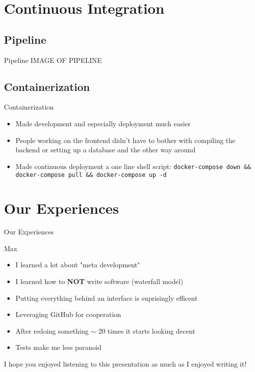 \documentclass{beamer}
\begin{document}
\section{Continuous Integration}
\subsection{Pipeline}
\begin{frame}{Pipeline}
  \Large{IMAGE OF PIPELINE}
\end{frame}

\subsection{Containerization}
\begin{frame}{Containerization}
  \begin{itemize}
    \item Made development and especially deployment much easier
    \item People working on the frontend didn't have to bother with compiling the backend or setting up a database and the other way around
    \item Made continuous deployment a one line shell script: \texttt{docker-compose down \&\& docker-compose pull \&\& docker-compose up -d}
  \end{itemize}
\end{frame}

\section{Our Experiences}

\begin{frame}
  \begin{center}
    \Huge{Our Experiences}
  \end{center}
\end{frame}

\begin{frame}{Max}
  \begin{itemize}
    \item I learned a lot about "meta development"
    \item I learned how to \textbf{NOT} write software (waterfall model)
    \item Putting everything behind an interface is suprisingly efficent
    \item Leveraging GitHub for cooperation
    \item After redoing something $\sim$ 20 times it starts looking decent
    \item Tests make me less paranoid
  \end{itemize}
\end{frame}

\begin{frame}
  \begin{center}
    \Huge{I hope you enjoyed listening to this presentation as much as I enjoyed writing it!}
  \end{center}
\end{frame}
\end{document}
